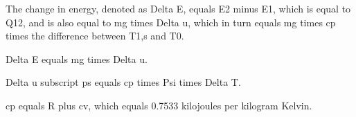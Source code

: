 The change in energy, denoted as Delta E, equals E2 minus E1, which is equal to Q12, and is also equal to mg times Delta u, which in turn equals mg times cp times the difference between T1,s and T0.

Delta E equals mg times Delta u.

Delta u subscript ps equals cp times Psi times Delta T.

cp equals R plus cv, which equals 0.7533 kilojoules per kilogram Kelvin.